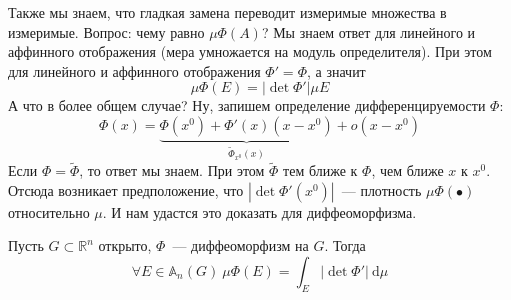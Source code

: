 \documentclass{article}
\begin{document}
    \begin{remark}
        Также мы знаем, что гладкая замена переводит измеримые множества в измеримые. Вопрос: чему равно $\mu\Phi(A)$? Мы знаем ответ для линейного и аффинного отображения (мера умножается на модуль определителя). При этом для линейного и аффинного отображения $\Phi'=\Phi$, а значит
        $$
        \mu\Phi(E)=|\det\Phi'|\mu E
        $$
        А что в более общем случае? Ну, запишем определение дифференцируемости $\Phi$:
        $$
        \Phi(x)=\underbrace{\Phi(x^0)+\Phi'(x)(x-x^0)}_{\widetilde\Phi_{x^0}(x)}+o(x-x^0)
        $$
        Если $\Phi=\widetilde\Phi$, то ответ мы знаем. При этом $\widetilde \Phi$ тем ближе к $\Phi$, чем ближе $x$ к $x^0$. Отсюда возникает предположение, что $|\det\Phi'(x^0)|$~--- плотность $\mu\Phi(\bullet)$ относительно $\mu$. И нам удастся это доказать для диффеоморфизма.
    \end{remark}
    \begin{theorem}
        \label{Преобразование меры Лебега при диффеоморфизме}
        Пусть $G\subset\mathbb R^n$ открыто, $\Phi$~--- диффеоморфизм на $G$. Тогда
        $$
        \forall E\in\mathbb A_n(G)~\mu\Phi(E)=\int_E|\det\Phi'|~\mathrm d\mu
        $$
    \end{theorem}
\end{document}
